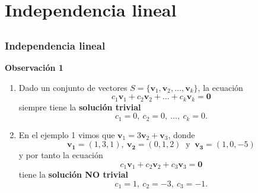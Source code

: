 \section{Independencia lineal}

\subsection{}

{\nologo
\begin{frame}\frametitle{Independencia lineal}

\begin{alertblock}{\textbf{Observación 1}}
	\begin{enumerate}\justifying
		\item[\labelname{$a$}] Dado un conjunto de vectores $S=\{\mathbf{v}_1,\mathbf{v}_2,\hdots,\mathbf{v}_k\}$,
		la ecuación
		\[
		c_1\mathbf{v}_1+c_2\mathbf{v}_2+\hdots+c_k\mathbf{v}_k = \mathbf{0}
		\]
		siempre tiene la \textbf{solución trivial}
		\[
		c_1 =0,\ c_2 =0,\ \hdots,\ c_k=0.
		\]
		
		\medskip
		\item[\labelname{$b$}] En el ejemplo 1 vimos que  $\mathbf{v}_1=3\mathbf{v}_2+\mathbf{v}_3$, donde  
		\[
		\mathbf{v_1}=(1,3,1),\ \mathbf{v_2}=(0,1,2) \ \text{ y } \  \mathbf{v_3}=(1,0,-5)
		\]
		y por tanto la ecuación
		\[
		c_1\mathbf{v}_1+c_2\mathbf{v}_2+c_3\mathbf{v}_3 = \mathbf{0}	
		\]
		tiene la \textbf{solución NO trivial}
		\[
		c_1 =1,\ c_2 =-3,\  c_3=-1.
		\]
		
	\end{enumerate}
\end{alertblock}

\end{frame}
}


\subsection{}

